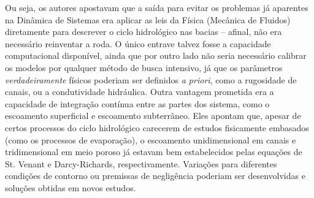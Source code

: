 \documentclass[./main.tex]{subfiles}
\begin{document}
\noindent Ou seja, os autores apostavam que a saída para evitar os problemas já aparentes na Dinâmica de Sistemas era aplicar as leis da Física (Mecânica de Fluidos) diretamente para descrever o ciclo hidrológico nas bacias -- afinal, não era necessário reinventar a roda. O único entrave talvez fosse a capacidade computacional disponível, ainda que por outro lado não seria necessário calibrar os modelos por qualquer método de busca intensivo, já que os parâmetros \textit{verdadeiramente} físicos poderiam ser definidos \textit{a priori}, como a rugosidade de canais, ou a condutividade hidráulica. Outra vantagem prometida era a capacidade de integração contínua entre as partes dos sistema, como o escoamento superficial e escoamento subterrâneo. Eles apontam que, apesar de certos processos do ciclo hidrológico carecerem de estudos fisicamente embasados (como os processos de evaporação), o escoamento unidimensional em canais e tridimensional em meio poroso já estavam bem estabelecidos pelas equações de St. Venant e Darcy-Richards, respectivamente. Variações para diferentes condições de contorno ou premissas de negligência poderiam ser desenvolvidas e soluções obtidas em novos estudos. 
\end{document}
